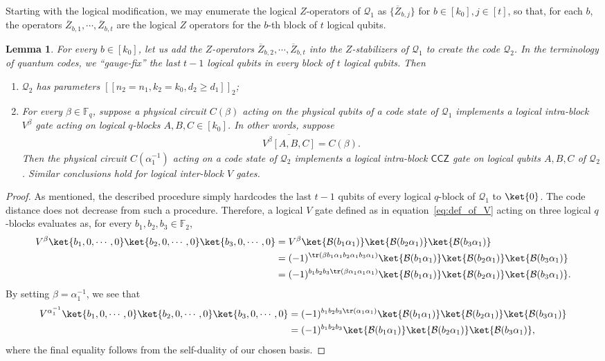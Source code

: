 \documentclass[11pt]{article}
\newtheorem{lemma}[theorem]{Lemma}
\theoremstyle{definition}
\renewcommand{\ge}{\geqslant}
\newcommand{\CCZ}{\mathsf{CCZ}}
\newcommand{\al}{\alpha}
\newcommand{\qcode}{\mathcal{Q}}
\newcommand{\FF}{\mathbb{F}}
\newcommand*{\ol}{\overline}
\newcommand{\B}{\mathcal{B}}
\newcommand{\phyC}[1]{C(#1)}
\begin{document}
Starting with the logical modification, we may enumerate the logical $Z$-operators of $\qcode_1$ as $\{\ol Z_{b,j}\}$ for $b\in [k_0], j\in [t]$, so that, for each $b$, the operators $\ol Z_{b,1}, \cdots, \ol Z_{b,t}$ are the logical $Z$ operators for the $b$-th block of $t$ logical qubits.
\begin{lemma}\label{lem:concatenation_logical}
    For every $b\in [k_0]$, let us add the $Z$-operators $\ol Z_{b, 2}, \cdots, \ol Z_{b,t}$ into the $Z$-stabilizers of $\qcode_1$ to create the code $\qcode_2$. 
    In the terminology of quantum codes, we ``gauge-fix'' the last $t-1$ logical qubits in every block of $t$ logical qubits. Then
    \begin{enumerate}[itemsep = 0pt]
        \item $\qcode_2$ has parameters  $[[n_2 = n_1, k_2 = k_0, d_2\ge d_1]]_2$;
        \item For every $\beta\in\FF_q$, suppose a physical circuit $\phyC{\beta}$ acting on the physical qubits of a code state of $\qcode_1$ implements a logical intra-block $V^\beta$ gate acting on logical $q$-blocks $A, B, C\in [k_0]$. In other words, suppose
        \begin{align}
            \ol{V^\beta[A, B, C]} = \phyC{\beta}.
        \end{align}
        Then the physical circuit $\phyC{\al_1^{-1}}$ acting on a code state of $\qcode_2$ implements a logical intra-block $\CCZ$ gate on logical qubits $A, B, C$ of $\qcode_2$. 
        Similar conclusions hold for logical inter-block $V$ gates.
    \end{enumerate}
\end{lemma}
\begin{proof}
    As mentioned, the described procedure simply hardcodes the last $t-1$ qubits of every logical $q$-block of $\qcode_1$ to $\ket{0}$. 
    The code distance does not decrease from such a procedure.
    Therefore, a logical $V$ gate defined as in equation~\eqref{eq:def_of_V} acting on three logical $q$-blocks evaluates as, for every $b_1,b_2,b_3\in \FF_2$,
    \begin{align}
        V^{\beta}
        \ket{b_1, 0, \cdots, 0}
        \ket{b_2, 0, \cdots, 0}
        \ket{b_3, 0, \cdots, 0}
        &= V^{\beta}\ket{\B(b_1\al_1)}\ket{\B(b_2\al_1)}\ket{\B(b_3\al_1)} \\
        &= (-1)^{\tr(\beta b_1\al_1b_2\al_1b_3\al_1)}\ket{\B(b_1\al_1)}\ket{\B(b_2\al_1)}\ket{\B(b_3\al_1)} \\
        &= (-1)^{b_1b_2b_3\tr(\beta \al_1\al_1\al_1)}\ket{\B(b_1\al_1)}\ket{\B(b_2\al_1)}\ket{\B(b_3\al_1)}.
    \end{align}
    By setting $\beta = \al_1^{-1}$, we see that 
    \begin{align}
        V^{\al_1^{-1}}
        \ket{b_1, 0, \cdots, 0}
        \ket{b_2, 0, \cdots, 0}
        \ket{b_3, 0, \cdots, 0}
        &= (-1)^{b_1b_2b_3\tr( \al_1\al_1)}\ket{\B(b_1\al_1)}\ket{\B(b_2\al_1)}\ket{\B(b_3\al_1)} \\
        &= (-1)^{b_1b_2b_3}\ket{\B(b_1\al_1)}\ket{\B(b_2\al_1)}\ket{\B(b_3\al_1)},
    \end{align}
    where the final equality follows from the self-duality of our chosen basis.
\end{proof}
\end{document}
